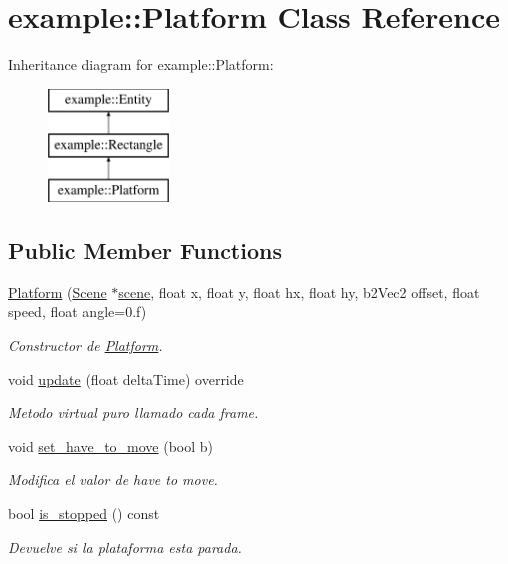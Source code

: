 \hypertarget{classexample_1_1_platform}{}\section{example\+::Platform Class Reference}
\label{classexample_1_1_platform}
Inheritance diagram for example\+::Platform\+:\begin{figure}[H]
\begin{center}
\leavevmode
\includegraphics[height=3.000000cm]{classexample_1_1_platform}
\end{center}
\end{figure}
\subsection*{Public Member Functions}
\begin{DoxyCompactItemize}
\item 
\mbox{\hyperlink{classexample_1_1_platform_a561d39d565ea2867f412143e3bbef07a}{Platform}} (\mbox{\hyperlink{classexample_1_1_scene}{Scene}} $\ast$\mbox{\hyperlink{classexample_1_1_entity_ab851dbde4a16829f9fb77ab9a66b9f1e}{scene}}, float x, float y, float hx, float hy, b2\+Vec2 offset, float speed, float angle=0.f)
\begin{DoxyCompactList}\small\item\em Constructor de \mbox{\hyperlink{classexample_1_1_platform}{Platform}}. \end{DoxyCompactList}\item 
void \mbox{\hyperlink{classexample_1_1_platform_a70a40dddbd963080b45d086f79c88b3e}{update}} (float delta\+Time) override
\begin{DoxyCompactList}\small\item\em Metodo virtual puro llamado cada frame. \end{DoxyCompactList}\item 
void \mbox{\hyperlink{classexample_1_1_platform_a8937b48574c62d1d9c3ccde8afad8d47}{set\+\_\+have\+\_\+to\+\_\+move}} (bool b)
\begin{DoxyCompactList}\small\item\em Modifica el valor de have to move. \end{DoxyCompactList}\item 
bool \mbox{\hyperlink{classexample_1_1_platform_a9e3f17752c041210ef9d4b21bf6e2001}{is\+\_\+stopped}} () const
\begin{DoxyCompactList}\small\item\em Devuelve si la plataforma esta parada. \end{DoxyCompactList}\end{DoxyCompactItemize}
